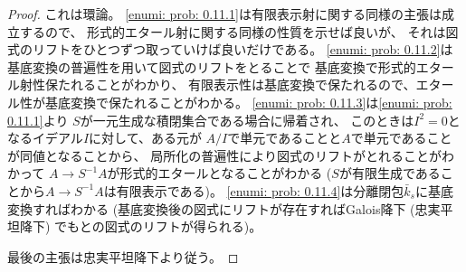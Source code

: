 \documentclass[uplatex]{jsarticle}
\theoremstyle{definition}
\begin{document}
\begin{proof}
  これは環論。
  \ref{enumi: prob: 0.11.1}は有限表示射に関する同様の主張は成立するので、
  形式的エタール射に関する同様の性質を示せば良いが、
  それは図式のリフトをひとつずつ取っていけば良いだけである。
  \ref{enumi: prob: 0.11.2}は基底変換の普遍性を用いて図式のリフトをとることで
  基底変換で形式的エタール射性保たれることがわかり、
  有限表示性は基底変換で保たれるので、エタール性が基底変換で保たれることがわかる。
  \ref{enumi: prob: 0.11.3}は\ref{enumi: prob: 0.11.1}より
  \(S\)が一元生成な積閉集合である場合に帰着され、
  このときは\(I^2 = 0\)となるイデアル\(I\)に対して、ある元が
  \(A/I\)で単元であることと\(A\)で単元であることが同値となることから、
  局所化の普遍性により図式のリフトがとれることがわかって
  \(A\to S^{-1}A\)が形式的エタールとなることがわかる
  (\(S\)が有限生成であることから\(A\to S^{-1}A\)は有限表示である)。
  \ref{enumi: prob: 0.11.4}は分離閉包\(\bar{k}_s\)に基底変換すればわかる
  (基底変換後の図式にリフトが存在すればGalois降下 (忠実平坦降下) でもとの図式のリフトが得られる)。

  最後の主張は忠実平坦降下より従う。
\end{proof}



\end{document}

